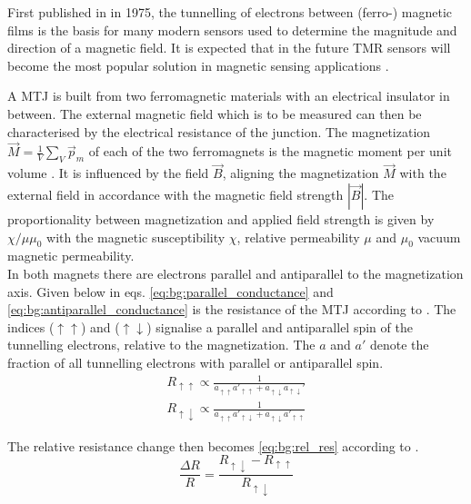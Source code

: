 First published in \parencite{JULLIERE1975} in 1975, the tunnelling of electrons between \mbox{(ferro-)} magnetic films is the basis for many modern sensors used to determine the magnitude and direction of a magnetic field. It is expected that in the future \ac{TMR} sensors will become the most popular solution in magnetic sensing applications \parencite{yan2022}.

A \ac{MTJ} is built from two ferromagnetic materials with an electrical insulator in between. The external magnetic field which is to be measured can then be characterised by the electrical resistance of the junction. The magnetization $\vec{M}=\frac1V\sum_V\vec{p}_m$ of each of the two ferromagnets is the magnetic moment per unit volume \parencite{Demtröder2017-eo}. It is influenced by the field $\vec{B}$, aligning the magnetization $\vec{M}$ with the external field in accordance with the magnetic field strength $
|\vec{B}|$. The proportionality between magnetization and applied field strength is given by $\chi/\mu\mu_0$ with the magnetic susceptibility $\chi$, relative permeability $\mu$ and $\mu_0$ vacuum magnetic permeability.\\
In both magnets there are electrons parallel and antiparallel to the magnetization axis. Given below in eqs. \eqref{eq:bg:parallel_conductance} and \eqref{eq:bg:antiparallel_conductance} is the resistance of the \ac{MTJ} according to \parencite{JULLIERE1975}. The indices ($\uparrow\uparrow$) and ($\uparrow\downarrow$) signalise a parallel and antiparallel spin of the tunnelling electrons, relative to the magnetization. The $a$ and $a'$ denote the fraction of all tunnelling electrons with parallel or antiparallel spin.
\begin{align}
    R_{\uparrow\uparrow}\propto \frac{1}{a^{}_{\uparrow\uparrow}a'_{\uparrow\uparrow}+a^{}_{\uparrow\downarrow}a_{\uparrow\downarrow}'}
    \label{eq:bg:parallel_conductance} \\
     R_{\uparrow\downarrow}\propto \frac{1}{a^{}_{\uparrow\uparrow}a'_{\uparrow\downarrow}+a^{}_{\uparrow\downarrow}a'_{\uparrow\uparrow}}
     \label{eq:bg:antiparallel_conductance}
\end{align}

The relative resistance change then becomes \eqref{eq:bg:rel_res} according to \parencite{moodera1995}.
\begin{equation}
    \frac{\Delta R}{R}=\frac{R_{\uparrow\downarrow} - R_{\uparrow\uparrow}}{R_{\uparrow\downarrow}}
    \label{eq:bg:rel_res}
\end{equation}

